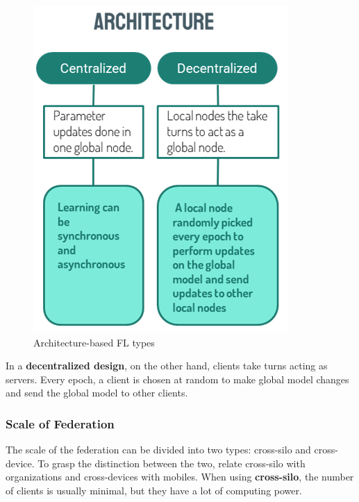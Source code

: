\begin{figure}[H]
\centering
\includegraphics[scale=0.5]{img/fl_architecture.png}
\caption{Architecture-based FL types}
\label{fig:fl_architecture}
\end{figure}


In a \textbf{decentralized design}, on the other hand, clients take turns acting as servers. Every epoch, a client is chosen at random to make global model changes and send the global model to other clients.

\subsubsection{Scale of Federation}

The scale of the federation can be divided into two types: cross-silo and cross-device. To grasp the distinction between the two, relate cross-silo with organizations and cross-devices with mobiles. When using \textbf{cross-silo}, the number of clients is usually minimal, but they have a lot of computing power. 

